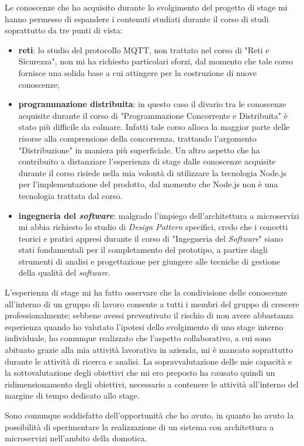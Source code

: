 Le conoscenze che ho acquisito durante lo svolgimento del progetto di stage mi hanno permesso di espandere i contenuti studiati durante il corso di studi soprattutto da tre punti di vista:
\begin{itemize}
  \item \textbf{reti}: lo studio del protocollo MQTT, non trattato nel corso di "Reti e Sicurezza", non mi ha richiesto particolari sforzi, dal momento che tale corso fornisce una solida base a cui attingere per la costruzione di nuove conoscenze;
  \item \textbf{programmazione distribuita}: in questo caso il divario tra le conoscenze acquisite durante il corso di "Programmazione Concorrente e Distribuita" è stato più difficile da colmare. Infatti tale corso alloca la maggior parte delle risorse alla comprensione della concorrenza, trattando l'argomento "Distribuzione" in maniera più superficiale. Un altro aspetto che ha contribuito a distanziare l'esperienza di stage dalle conoscenze acquisite durante il corso risiede nella mia volontà di utilizzare la tecnologia Node.js per l'implementazione del prodotto, dal momento che Node.js non è una tecnologia trattata dal corso.
  \item \textbf{ingegneria del \emph{software}}: malgrado l'impiego dell'architettura a microservizi mi abbia richiesto lo studio di \emph{Design Pattern} specifici, credo che i concetti teorici e pratici appresi durante il corso di "Ingegneria del \emph{Software}" siano stati fondamentali per il completamento del prototipo, a partire dagli strumenti di analisi e progettazione per giungere alle tecniche di gestione della qualità del \emph{software}.
\end{itemize}

L'esperienza di stage mi ha fatto osservare che la condivisione delle conoscenze all'interno di un gruppo di lavoro consente a tutti i membri del gruppo di crescere professionalmente; sebbene avessi preventivato il rischio di non avere abbastanza esperienza quando ho valutato l'ipotesi dello svolgimento di uno stage interno individuale, ho comunque realizzato che l'aspetto collaborativo, a cui sono abituato grazie alla mia attività lavorativa in azienda, mi è mancato soprattutto durante le attività di ricerca e analisi. La sopravvalutazione delle mie capacità e la sottovalutazione degli obiettivi che mi ero preposto ha causato quindi un ridimensionamento degli obiettivi, necessario a contenere le attività all'interno del margine di tempo dedicato allo stage.

Sono comunque soddisfatto dell'opportunità che ho avuto, in quanto ho avuto la possibilità di sperimentare la realizzazione di un sistema con architettura a microservizi nell'ambito della domotica.
